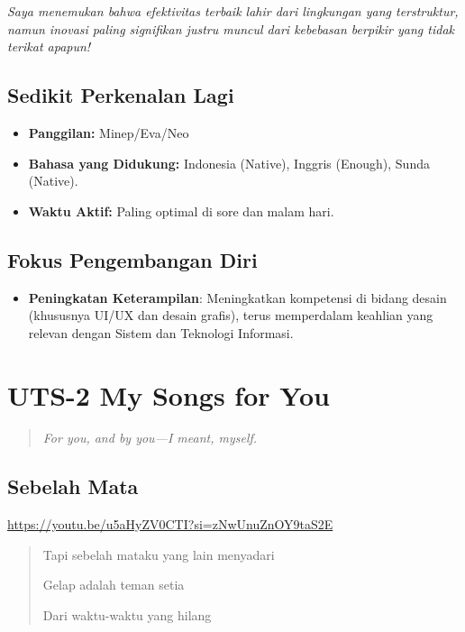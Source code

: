 \documentclass[
  letterpaper,
  DIV=11,
  numbers=noendperiod]{scrreprt}
\providecommand{\tightlist}{%
  \setlength{\itemsep}{0pt}\setlength{\parskip}{0pt}}
\begin{document}
\emph{Saya menemukan bahwa efektivitas terbaik lahir dari lingkungan
yang terstruktur, namun inovasi paling signifikan justru muncul dari
kebebasan berpikir yang tidak terikat apapun!}

\section{Sedikit Perkenalan Lagi}\label{sedikit-perkenalan-lagi}

\begin{itemize}
\tightlist
\item
  \textbf{Panggilan:} Minep/Eva/Neo
\item
  \textbf{Bahasa yang Didukung:} Indonesia (Native), Inggris (Enough),
  Sunda (Native).
\item
  \textbf{Waktu Aktif:} Paling optimal di sore dan malam hari.
\end{itemize}

\section{Fokus Pengembangan Diri}\label{fokus-pengembangan-diri}

\begin{itemize}
\tightlist
\item
  \textbf{Peningkatan Keterampilan}: Meningkatkan kompetensi di bidang
  desain (khususnya UI/UX dan desain grafis), terus memperdalam keahlian
  yang relevan dengan Sistem dan Teknologi Informasi.
\end{itemize}


\chapter{UTS-2 My Songs for You}\label{uts-2-my-songs-for-you}

\begin{quote}
\emph{For you, and by you---I meant, myself.}
\end{quote}

\section{Sebelah Mata}\label{sebelah-mata}

\url{https://youtu.be/u5aHyZV0CTI?si=zNwUnuZnOY9taS2E}

\begin{quote}
Tapi sebelah mataku yang lain menyadari

Gelap adalah teman setia

Dari waktu-waktu yang hilang
\end{quote}
\end{document}

